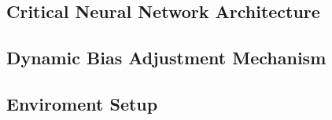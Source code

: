 \subsection{Critical Neural Network Architecture}

\subsection{Dynamic Bias Adjustment Mechanism}


\subsection{Enviroment Setup}

